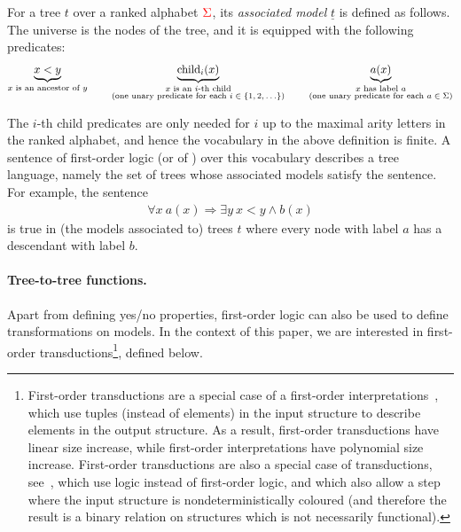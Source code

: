 \begin{definition}\label{def:tree-model}
   For a tree $t$  over a ranked alphabet ${\color{red}{\Sigma}}$, its \emph{associated model} $\underline t$ is defined as follows. The  universe is the nodes of the tree, and it is equipped with the following predicates:
    \begin{align*}
        \underbrace{x < y}_{\substack{\text{$x$ is an ancestor of $y$}}} \qquad \underbrace{\mathrm{child}_i(x)}_{\substack{\text{$x$ is an $i$-th child}\\ \text{(one unary predicate for each $i\in \{1,2,\ldots\}$)}}}
        \qquad \underbrace{a(x)}_{\substack{\text{$x$ has label $a$}\\ \text{(one unary predicate for each $a \in \Sigma$)}}}
    \end{align*}
    \end{definition}

The $i$-th child predicates are only needed for $i$ up to the maximal arity letters in the ranked alphabet, and hence the vocabulary in the above definition is finite. 
 A sentence of first-order logic (or of \mso)  over this vocabulary   describes a tree language, namely the set of trees whose associated models satisfy the sentence.  For example, the sentence 
 \begin{align*}
 \forall x \ a(x) \Rightarrow \exists y \ x < y \land b(x)
 \end{align*} 
 is true in (the models associated to)  trees $t$ where every node with label $a$ has a descendant with label $b$.  
 
 \paragraph*{Tree-to-tree functions.}
 Apart from defining yes/no properties, first-order logic can also be used  to define transformations on  models. In the context of this paper, we are interested in first-order transductions\footnote{
    First-order transductions are  a special case of a first-order interpretations~\cite[p.~213]{hodges_model_1993}, which use tuples (instead of elements) in the input structure to describe elements in the output structure. As a result, first-order transductions have linear size increase, while first-order interpretations have polynomial size increase. First-order transductions are also a special case of \mso transductions, see~\cite[Section 7]{courcelle_graph_2012}, which use \mso logic instead of first-order logic, and which also allow a step where the input structure is nondeterministically coloured (and therefore the result is a binary relation on structures which is not necessarily functional).
 }, defined below. 

